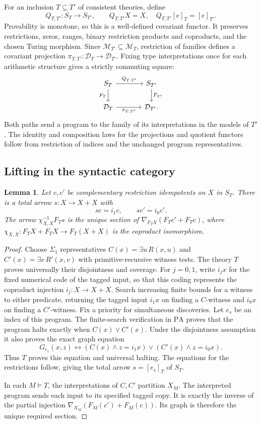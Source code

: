 \documentclass[11pt]{article}
\newtheorem{lemma}[theorem]{Lemma}
\newcommand{\PA}{\mathrm{PA}}
\begin{document}
For an inclusion $T\subseteq T'$ of consistent theories, define
\[
 Q_{T,T'}:S_T\to S_{T'},\qquad
 Q_{T,T'}X=X,\quad Q_{T,T'}[e]_T=[e]_{T'}.
\]
Provability is monotone, so this is a well-defined covariant functor.
It preserves restrictions, zeros, ranges, binary restriction products
and coproducts, and the chosen Turing morphism.
Since $\mathcal M_{T'}\subseteq\mathcal M_T$, restriction of families
defines a covariant projection
$\pi_{T,T'}:\mathcal D_T\to\mathcal D_{T'}$. Fixing type interpretations
once for each arithmetic structure gives a strictly commuting square:
\[
\begin{tikzcd}[column sep=large]
 S_T \arrow[r,"Q_{T,T'}"] \arrow[d,"F_T"'] &
 S_{T'} \arrow[d,"F_{T'}"]\\
 \mathcal D_T \arrow[r,"\pi_{T,T'}"'] & \mathcal D_{T'}.
\end{tikzcd}
\]
Both paths send a program to the family of its interpretations in the
models of $T'$. The identity and composition laws for the projections
and quotient functors follow from restriction of indices and the
unchanged program representatives.

\subsection{Lifting in the syntactic category}

\begin{lemma}\label{lem:switch}
Let $c,c'$ be complementary restriction idempotents on $X$ in $S_T$.
There is a total arrow $s:X\to X+X$ with
\[
 sc=i_1c,\qquad sc'=i_0c'.
\]
The arrow $\chi_{X,X}^{-1}F_Ts$ is the unique section of
$\nabla_{F_TX}(F_Tc'+F_Tc)$, where
$\chi_{X,X}:F_TX+F_TX\to F_T(X+X)$ is the coproduct isomorphism.
\end{lemma}
\begin{proof}
Choose $\Sigma_1$ representatives $C(x)=\exists u\,R(x,u)$ and
$C'(x)=\exists v\,R'(x,v)$ with primitive-recursive witness tests.
The theory $T$ proves universally their disjointness and coverage.
For $j=0,1$, write $i_jx$ for the fixed numerical code of the
tagged input, so that this coding represents the coproduct injection
$i_j:X\to X+X$.
Search increasing finite bounds for a witness to either predicate,
returning the tagged input $i_1x$ on finding a $C$-witness and $i_0x$
on finding a $C'$-witness. Fix a priority for simultaneous discoveries.
Let $e_s$ be an index of this program. The finite-search verification
in $\PA$ proves that the program halts
exactly when $C(x)\lor C'(x)$. Under the disjointness assumption it also
proves the exact graph equation
\[
 G_{e_s}(x,z)\leftrightarrow
 (C(x)\land z=i_1x)\lor(C'(x)\land z=i_0x).
\]
Thus $T$ proves this equation and universal halting. The equations for
the restrictions follow, giving the total arrow $s=[e_s]_T$ of $S_T$.

In each $M\models T$, the interpretations of $C,C'$ partition $X_M$.
The interpreted program sends each input to its specified tagged copy.
It is exactly the inverse of the partial injection
$\nabla_{X_M}(F_M(c')+F_M(c))$. Its graph is therefore the unique required
section.
\end{proof}
\end{document}
